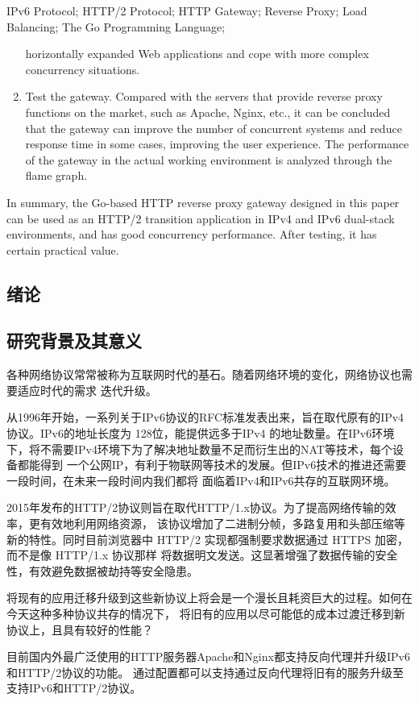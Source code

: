 \documentclass[twoside]{CUGThesis}
\begin{document}
\begin{enabstract}{IPv6 Protocol; HTTP/2 Protocol; HTTP Gateway; Reverse Proxy; Load Balancing; The Go Programming Language;}
\begin{enumerate}
			 horizontally expanded Web applications and cope with more complex concurrency situations.
			 \item Test the gateway. Compared with the servers that provide reverse proxy functions on the market, such as Apache, Nginx, etc., it can be concluded
			  that the gateway can improve the number of concurrent systems and reduce response time in some cases, improving the user experience. The performance of the gateway
			   in the actual working environment is analyzed through the flame graph.
		 \end{enumerate}
		 \par
		 In summary, the Go-based HTTP reverse proxy gateway designed in this paper can be used as an HTTP/2 transition application in IPv4 and IPv6 dual-stack environments, and has good concurrency
		  performance. After testing, it has certain practical value.
	\end{enabstract}
	
	\makeToc
	
	
	\begin{spacing}{2}
		\section{绪论}
	\end{spacing}
	\subsection{研究背景及其意义}
	各种网络协议常常被称为互联网时代的基石。随着网络环境的变化，网络协议也需要适应时代的需求
	迭代升级。\par
	从1996年开始，一系列关于IPv6协议的RFC标准发表出来，旨在取代原有的IPv4协议。IPv6的地址长度为
	128位，能提供远多于IPv4 的地址数量。在IPv6环境下，将不需要IPv4环境下为了解决地址数量不足而衍生出的NAT等技术，每个设备都能得到
	一个公网IP，有利于物联网等技术的发展。但IPv6技术的推进还需要一段时间，在未来一段时间内我们都将
	面临着IPv4和IPv6共存的互联网环境。\par
		2015年发布的HTTP/2协议则旨在取代HTTP/1.x协议。为了提高网络传输的效率，更有效地利用网络资源，
	该协议增加了二进制分帧，多路复用和头部压缩等新的特性。同时目前浏览器中 HTTP/2 
	实现都强制要求数据通过 HTTPS 加密，而不是像 HTTP/1.x 协议那样
	将数据明文发送。这显著增强了数据传输的安全性，有效避免数据被劫持等安全隐患。\par
	将现有的应用迁移升级到这些新协议上将会是一个漫长且耗资巨大的过程。如何在今天这种多种协议共存的情况下，
	将旧有的应用以尽可能低的成本过渡迁移到新协议上，且具有较好的性能？\par
		目前国内外最广泛使用的HTTP服务器Apache和Nginx都支持反向代理并升级IPv6和HTTP/2协议的功能。
		通过配置都可以支持通过反向代理将旧有的服务升级至支持IPv6和HTTP/2协议。
\end{document}
